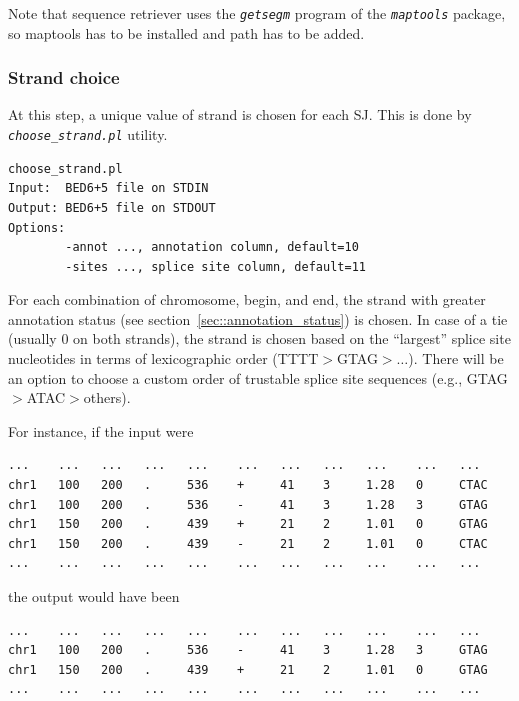 \documentclass{article}
\newcommand{\prog}[1]{{\tt\em #1}}
\begin{document}
Note that sequence retriever uses the \prog{getsegm} program of the \prog{maptools} package, so maptools has to be installed and path has to be added.


\subsubsection{Strand choice}
At this step, a unique value of strand is chosen for each SJ. This is done by \prog{choose\_strand.pl} utility. 
\begin{verbatim}
choose_strand.pl
Input:  BED6+5 file on STDIN
Output: BED6+5 file on STDOUT
Options:
        -annot ..., annotation column, default=10
        -sites ..., splice site column, default=11
\end{verbatim}
For each combination of chromosome, begin, and end, the strand with greater annotation status (see section~\ref{sec::annotation_status}) is chosen. In case of 
a tie (usually $0$ on both strands), the strand is chosen based on the ``largest'' splice site nucleotides in terms of lexicographic order (TTTT$>$GTAG$>\dots$).
There will be an option to choose a custom order of trustable splice site sequences (e.g., GTAG$>$ATAC$>$others).

For instance, if the input were
\begin{verbatim}
...    ...   ...   ...   ...    ...   ...   ...   ...    ...   ...
chr1   100   200   .     536    +     41    3     1.28   0     CTAC
chr1   100   200   .     536    -     41    3     1.28   3     GTAG
chr1   150   200   .     439    +     21    2     1.01   0     GTAG
chr1   150   200   .     439    -     21    2     1.01   0     CTAC
...    ...   ...   ...   ...    ...   ...   ...   ...    ...   ...
\end{verbatim}
the output would have been 
\begin{verbatim}
...    ...   ...   ...   ...    ...   ...   ...   ...    ...   ...
chr1   100   200   .     536    -     41    3     1.28   3     GTAG
chr1   150   200   .     439    +     21    2     1.01   0     GTAG
...    ...   ...   ...   ...    ...   ...   ...   ...    ...   ...
\end{verbatim}

\end{document}
